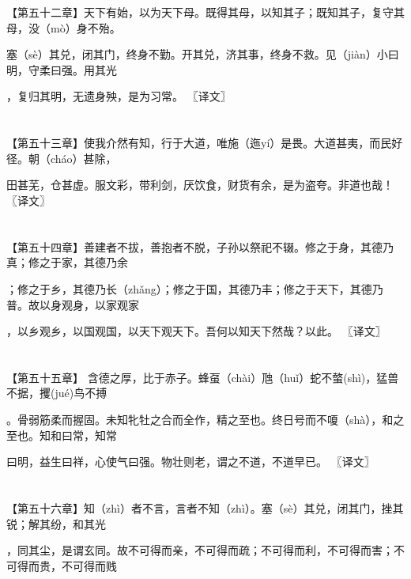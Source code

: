 \documentclass[a4paper,12pt,UTF8,twoside]{ctexbook}
\begin{document}
	
	
	
	
	【第五十二章】天下有始，以为天下母。既得其母，以知其子；既知其子，复守其母，没（mò）身不殆。
	
	塞（sè）其兑，闭其门，终身不勤。开其兑，济其事，终身不救。见（jiàn）小曰明，守柔曰强。用其光
	
	，复归其明，无遗身殃，是为习常。 〖译文〗
	
	\chapter{}	
	
	【第五十三章】使我介然有知，行于大道，唯施（迤yí）是畏。大道甚夷，而民好径。朝（cháo）甚除，
	
	田甚芜，仓甚虚。服文彩，带利剑，厌饮食，财货有余，是为盗夸。非道也哉！ 〖译文〗
	
	\chapter{}	
	
	【第五十四章】善建者不拔，善抱者不脱，子孙以祭祀不辍。修之于身，其德乃真；修之于家，其德乃余
	
	；修之于乡，其德乃长（zhǎng）；修之于国，其德乃丰；修之于天下，其德乃普。故以身观身，以家观家
	
	，以乡观乡，以国观国，以天下观天下。吾何以知天下然哉？以此。 〖译文〗
	
	\chapter{}	
	
	【第五十五章】 含德之厚，比于赤子。蜂虿（chài）虺（huǐ）蛇不螫(shì)，猛兽不据，攫(jué)鸟不搏
	
	。骨弱筋柔而握固。未知牝牡之合而全作，精之至也。终日号而不嗄（shà），和之至也。知和曰常，知常
	
	曰明，益生曰祥，心使气曰强。物壮则老，谓之不道，不道早已。 〖译文〗
	
	\chapter{}	
	
	【第五十六章】知（zhì）者不言，言者不知（zhì）。塞（sè）其兑，闭其门，挫其锐；解其纷，和其光
	
	，同其尘，是谓玄同。故不可得而亲，不可得而疏；不可得而利，不可得而害；不可得而贵，不可得而贱
	
\end{document}
